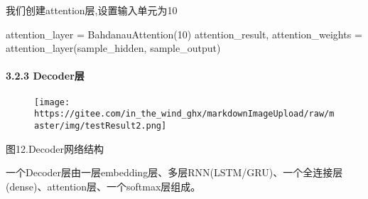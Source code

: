 \documentclass[
]{article}
\newenvironment{Shaded}{}{}
\newcommand{\DecValTok}[1]{\textcolor[rgb]{0.25,0.63,0.44}{#1}}
\newcommand{\NormalTok}[1]{#1}
\newcommand{\OperatorTok}[1]{\textcolor[rgb]{0.40,0.40,0.40}{#1}}
\begin{document}
我们创建attention层,设置输入单元为10

\begin{Shaded}
\begin{Highlighting}[]
\NormalTok{attention\_layer }\OperatorTok{=}\NormalTok{ BahdanauAttention(}\DecValTok{10}\NormalTok{)}
\NormalTok{attention\_result, attention\_weights }\OperatorTok{=}\NormalTok{ attention\_layer(sample\_hidden, sample\_output)}
\end{Highlighting}
\end{Shaded}

\hypertarget{header-n129}{%
\paragraph{3.2.3 Decoder层}\label{header-n129}}

\begin{figure}
\centering
\texttt{[image: https://gitee.com/in\_the\_wind\_ghx/markdownImageUpload/raw/master/img/testResult2.png]}
\caption{}
\end{figure}

图12.Decoder网络结构

一个Decoder层由一层embedding层、多层RNN(LSTM/GRU)、一个全连接层(dense)、attention层、一个softmax层组成。
\end{document}
